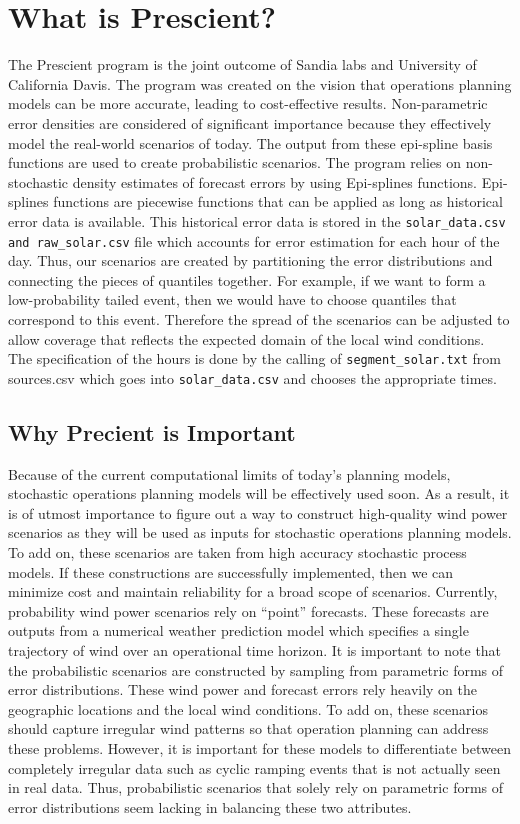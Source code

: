 \documentclass[12pt]{article}
\begin{document}
\section{What is Prescient?}
The Prescient program is the joint outcome of Sandia labs and University of California Davis. The program was created on the vision that operations planning models can be more accurate, leading to cost-effective results. Non-parametric error densities are considered of significant importance because they effectively model the real-world scenarios of today. The output from these epi-spline basis functions are used to create probabilistic scenarios.
\indexspace The program relies on non-stochastic density estimates of forecast errors by using Epi-splines functions. Epi-splines functions are piecewise functions that can be applied as long as historical error data is available. This historical error data is stored in the \verb|solar_data.csv and raw_solar.csv| file which accounts for error estimation for each hour of the day. Thus, our scenarios are created by partitioning the error distributions and connecting the pieces of quantiles together. For example, if we want to form a low-probability tailed event, then we would have to choose quantiles that correspond to this event. Therefore the spread of the scenarios can be adjusted to allow coverage that reflects the expected domain of the local wind conditions. The specification of the hours is done by the calling of \verb|segment_solar.txt| from sources.csv which goes into \verb|solar_data.csv| and chooses the appropriate times. 
\subsection{Why Precient is Important}
Because of the current computational limits of today’s planning models, stochastic operations planning models will be effectively used soon. As a result, it is of utmost importance to figure out a way to construct high-quality wind power scenarios as they will be used as inputs for stochastic operations planning models. To add on, these scenarios are taken from high accuracy stochastic process models. If these constructions are successfully implemented, then we can minimize cost and maintain reliability for a broad scope of scenarios.
\indexspace
Currently, probability wind power scenarios rely on “point” forecasts. These forecasts are outputs from a numerical weather prediction model which specifies a single trajectory of wind over an operational time horizon. It is important to note that the probabilistic scenarios are constructed by sampling from parametric forms of error distributions. These wind power and forecast errors rely heavily on the geographic locations and the local wind conditions. To add on, these scenarios should capture irregular wind patterns so that operation planning can address these problems. However, it is important for these models to differentiate between completely irregular data such as cyclic ramping events that is not actually seen in real data. Thus, probabilistic scenarios that solely rely on parametric forms of error distributions seem lacking in balancing these two attributes.
\end{document}
